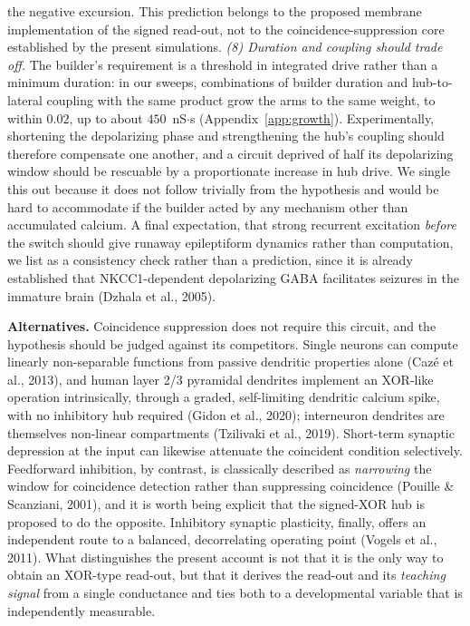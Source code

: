 \documentclass[11pt,a4paper]{article}
\begin{document}
the negative excursion. This prediction belongs to the proposed membrane implementation of the signed read-out, not to the coincidence-suppression core established by the present simulations. \emph{(8) Duration and coupling should trade off.} The builder's requirement is a threshold in integrated drive rather than a minimum duration: in our sweeps, combinations of builder duration and hub-to-lateral coupling with the same product grow the arms to the same weight, to within $0.02$, up to about $450$~nS$\cdot$s (Appendix~\ref{app:growth}). Experimentally, shortening the depolarizing phase and strengthening the hub's coupling should therefore compensate one another, and a circuit deprived of half its depolarizing window should be rescuable by a proportionate increase in hub drive. We single this out because it does not follow trivially from the hypothesis and would be hard to accommodate if the builder acted by any mechanism other than accumulated calcium. A final expectation, that strong recurrent excitation \emph{before} the switch should give runaway epileptiform dynamics rather than computation, we list as a consistency check rather than a prediction, since it is already established that NKCC1-dependent depolarizing GABA facilitates seizures in the immature brain (Dzhala et al., 2005).

\textbf{Alternatives.} Coincidence suppression does not require this circuit, and the hypothesis should be judged against its competitors. Single neurons can compute linearly non-separable functions from passive dendritic properties alone (Caz\'e et al., 2013), and human layer 2/3 pyramidal dendrites implement an XOR-like operation intrinsically, through a graded, self-limiting dendritic calcium spike, with no inhibitory hub required (Gidon et al., 2020); interneuron dendrites are themselves non-linear compartments (Tzilivaki et al., 2019). Short-term synaptic depression at the input can likewise attenuate the coincident condition selectively. Feedforward inhibition, by contrast, is classically described as \emph{narrowing} the window for coincidence detection rather than suppressing coincidence (Pouille \& Scanziani, 2001), and it is worth being explicit that the signed-XOR hub is proposed to do the opposite. Inhibitory synaptic plasticity, finally, offers an independent route to a balanced, decorrelating operating point (Vogels et al., 2011). What distinguishes the present account is not that it is the only way to obtain an XOR-type read-out, but that it derives the read-out and its \emph{teaching signal} from a single conductance and ties both to a developmental variable that is independently measurable.
\end{document}
